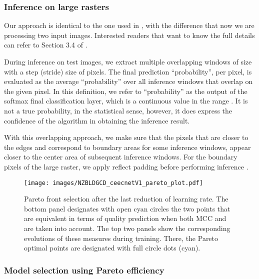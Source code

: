 \documentclass[times, 5p]{elsarticle}
\begin{document}
\subsubsection{Inference on large rasters}

Our approach is identical to the one used in  \cite{DIAKOGIANNIS202094}, with the difference that now we are processing two input images. Interested readers that want to know the full details can refer to Section 3.4 of \cite{DIAKOGIANNIS202094}. 

During inference on test images, we extract multiple overlapping windows of size  with a step (stride) size of  pixels. The final prediction ``probability'', per pixel, is evaluated as the average ``probability'' over all inference windows that overlap on the given pixel. In this definition, we refer to ``probability'' as the output of the softmax final classification layer, which is a continuous value in the range . It is not a true probability, in the statistical sense, however, it does express the confidence of the algorithm in obtaining the inference result.  

With this overlapping approach, we make sure that the pixels that are closer to the edges and correspond to boundary areas for some inference windows, appear closer to the center area of subsequent inference windows. For the boundary pixels of the large raster, we apply reflect padding before performing inference \citep{DBLP:journals/corr/RonnebergerFB15}. 



\begin{figure}
\centering
\texttt{[image: images/NZBLDGCD\_ceecnetV1\_pareto\_plot.pdf]}
\caption{Pareto front selection after the last reduction of learning rate. The bottom panel designates with open cyan circles the two points that are equivalent in terms of quality prediction when both MCC and  are taken into account. The top two panels show the corresponding evolutions of these measures during training. There, the Pareto optimal points are designated with full circle dots (cyan). } 
\label{pareto_selection}
\end{figure}

\subsubsection{Model selection using Pareto efficiency}


 
\end{document}
